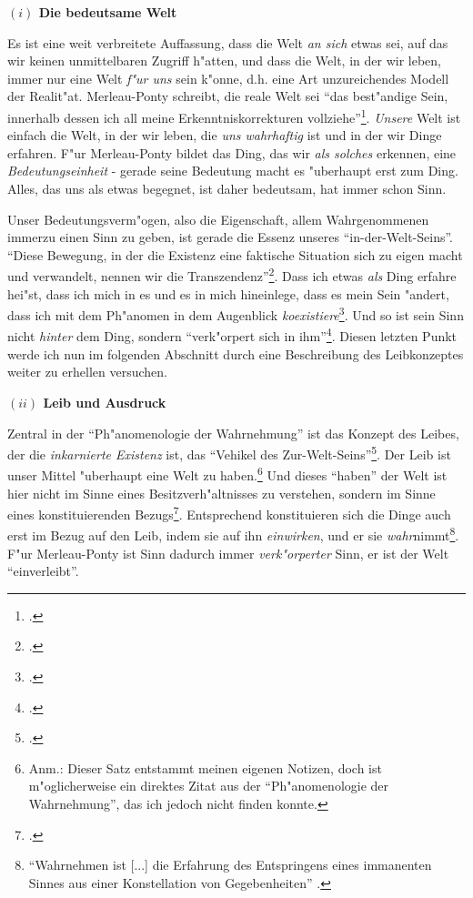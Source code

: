 \documentclass[a4paper, 12pt]{article}
\begin{document}
\begin{onehalfspace}
\vspace{5mm}

\noindent\textbf{$(i)$ Die bedeutsame Welt}

\noindent Es ist eine weit verbreitete Auffassung, dass die Welt \emph{an sich} etwas sei, auf das wir keinen unmittelbaren Zugriff h"atten, und dass die Welt, in der wir leben, immer nur eine Welt \emph{f"ur uns} sein k"onne, d.h. eine Art unzureichendes Modell der Realit"at. Merleau-Ponty schreibt, die reale Welt sei "`das best"andige Sein, innerhalb dessen ich all meine Erkenntniskorrekturen vollziehe"'\footnote{\cite[S. 379]{merleau1966phanomenologie}.}. \emph{Unsere} Welt ist einfach die Welt, in der wir leben, die \emph{uns wahrhaftig} ist und in der wir Dinge erfahren. F"ur Merleau-Ponty bildet das Ding, das wir \emph{als solches} erkennen, eine \emph{Bedeutungseinheit} - gerade seine Bedeutung macht es "uberhaupt erst zum Ding. Alles, das uns als etwas begegnet, ist daher bedeutsam, hat immer schon Sinn.

Unser Bedeutungsverm"ogen, also die Eigenschaft, allem Wahrgenommenen immerzu einen Sinn zu geben, ist gerade die Essenz unseres "`in-der-Welt-Seins"'. "`Diese Bewegung, in der die Existenz eine faktische Situation sich zu eigen macht und verwandelt, nennen wir die Transzendenz"'\footnote{\cite[S. 202]{merleau1966phanomenologie}.}. Dass ich etwas \emph{als} Ding erfahre hei"st, dass ich mich in es und es in mich hineinlege, dass es mein Sein "andert, dass ich mit dem Ph"anomen in dem Augenblick \emph{koexistiere}\footnote{\cite[Vgl.][S. 368]{merleau1966phanomenologie}.}. Und so ist sein Sinn nicht \emph{hinter} dem Ding, sondern "`verk"orpert sich in ihm"'\footnote{\cite[S. 370]{merleau1966phanomenologie}.}. Diesen letzten Punkt werde ich nun im folgenden Abschnitt durch eine Beschreibung des Leibkonzeptes weiter zu erhellen versuchen. 

\vspace{5mm}

\noindent\textbf{$(ii)$ Leib und Ausdruck}

\noindent Zentral in der "`Ph"anomenologie der Wahrnehmung"' ist das Konzept des Leibes, der die \emph{inkarnierte Existenz} ist, das "`Vehikel des Zur-Welt-Seins"'\footnote{\cite[S. 106]{merleau1966phanomenologie}.}. Der Leib ist unser Mittel "uberhaupt eine Welt zu haben.\footnote{Anm.: Dieser Satz entstammt meinen eigenen Notizen, doch ist m"oglicherweise ein direktes Zitat aus der "`Ph"anomenologie der Wahrnehmung"', das ich jedoch nicht finden konnte.} Und dieses "`haben"' der Welt ist hier nicht im Sinne eines Besitzverh"altnisses zu verstehen, sondern im Sinne eines konstituierenden Bezugs\footnote{\cite[Vgl.][S. 207]{merleau1966phanomenologie}.}. Entsprechend konstituieren sich die Dinge auch erst im Bezug auf den Leib, indem sie auf ihn \emph{einwirken}, und er sie \emph{wahr}nimmt\footnote{"`Wahrnehmen ist [...] die Erfahrung des Entspringens eines immanenten Sinnes aus einer Konstellation von Gegebenheiten"' \citep[S. 42]{merleau1966phanomenologie}.}. F"ur Merleau-Ponty ist Sinn dadurch immer \emph{verk"orperter} Sinn, er ist der Welt "`einverleibt"'.


\end{onehalfspace}
\end{document}
